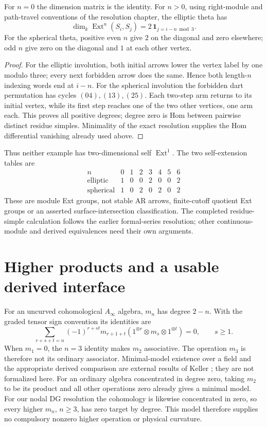 \begin{proposition}\label{dg:theta-ext}
For $n=0$ the dimension matrix is the identity. For $n>0$, using right-module
and path-travel conventions of the resolution chapter, the elliptic theta has
\[
 \dim_k\operatorname{Ext}^n(S_i,S_j)
    =2\,\mathbf1_{j=i-n\bmod3}.
\]
For the spherical theta, positive even $n$ give $2$ on the diagonal and zero
elsewhere; odd $n$ give zero on the diagonal and $1$ at each other vertex.
\end{proposition}
\begin{proof}
For the elliptic involution, both initial arrows lower the vertex label by
one modulo three; every next forbidden arrow does the same. Hence both
length-$n$ indexing words end at $i-n$. For the spherical involution the
forbidden dart permutation has cycles $(04),(13),(25)$. Each two-step arm
returns to its initial vertex, while its first step reaches one of the two
other vertices, one arm each. This proves all positive degrees; degree zero
is Hom between pairwise distinct residue simples. Minimality of the exact
resolution supplies the Hom differential vanishing already used above.
\end{proof}
Thus neither example has two-dimensional self $\operatorname{Ext}^1$.
The two self-extension tables are
\[
\begin{array}{c|rrrrrrr}
n&0&1&2&3&4&5&6\\\hline
\text{elliptic}&1&0&0&2&0&0&2\\
\text{spherical}&1&0&2&0&2&0&2
\end{array}
\]
These are module Ext groups, not stable AR arrows, finite-cutoff quotient
Ext groups or an asserted surface-intersection classification. The completed
residue-simple calculation follows the earlier formal-series resolution;
other continuous-module and derived equivalences need their own arguments.

\section{Higher products and a usable derived interface}
For an uncurved cohomological $A_\infty$ algebra, $m_n$ has degree $2-n$.
With the graded tensor sign convention its identities are
\[
 \sum_{r+s+t=n}(-1)^{r+st}
 m_{r+1+t}(1^{\otimes r}\otimes m_s\otimes1^{\otimes t})=0,
 \qquad s\ge1.
\]
When $m_1=0$, the $n=3$ identity makes $m_2$ associative. The operation
$m_3$ is therefore not its ordinary associator. Minimal-model existence
over a field and the appropriate derived comparison are external results
of Keller \cite[\S\S3.1,3.3,6.2]{KellerAinf}; they are not formalized here.
For an ordinary algebra concentrated in degree zero, taking $m_2$ to be
its product and all other operations zero already gives a minimal model.
For our nodal DG resolution the cohomology is likewise concentrated in zero,
so every higher $m_n$, $n\ge3$, has zero target by degree. This model
therefore supplies no compulsory nonzero higher operation or physical
curvature.

